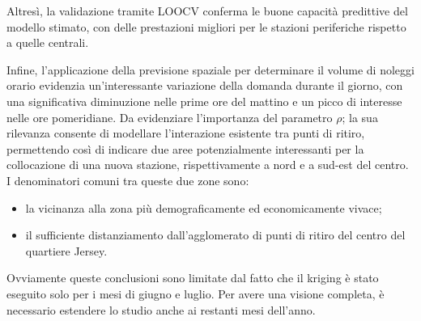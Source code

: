 \par Altresì, la validazione tramite LOOCV conferma le buone capacità predittive del modello stimato, con delle prestazioni migliori per le stazioni periferiche rispetto a quelle centrali. 
\par Infine, l'applicazione della previsione spaziale per determinare il volume di noleggi orario evidenzia un'interessante variazione della domanda durante il giorno, con una significativa diminuzione nelle prime ore del mattino e un picco di interesse nelle ore pomeridiane. Da evidenziare l'importanza del parametro $\rho$; la sua rilevanza consente di modellare l'interazione esistente tra punti di ritiro, permettendo così di indicare due aree potenzialmente interessanti per la collocazione di una nuova stazione, rispettivamente a nord e a sud-est del centro. I denominatori comuni tra queste due zone sono:
\begin{itemize}
	\item la vicinanza alla zona più demograficamente ed economicamente vivace;
	\item il sufficiente distanziamento dall'agglomerato di punti di ritiro del centro del quartiere Jersey.
\end{itemize}
Ovviamente queste conclusioni sono limitate dal fatto che il kriging è stato eseguito solo per i mesi di giugno e luglio. Per avere una visione completa, è necessario estendere lo studio anche ai restanti mesi dell'anno.
